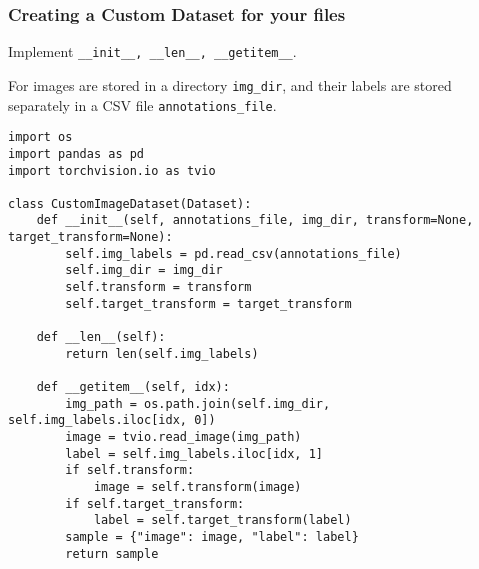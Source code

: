 \begin{frame}[fragile]
\frametitle{Creating a Custom Dataset for your files}

Implement \lstinline|__init__, __len__, __getitem__|.

For images are stored in a directory \lstinline|img_dir|, and their labels are stored separately in a CSV file \lstinline|annotations_file|.

\begin{lstlisting}
import os
import pandas as pd
import torchvision.io as tvio

class CustomImageDataset(Dataset):
    def __init__(self, annotations_file, img_dir, transform=None, target_transform=None):
        self.img_labels = pd.read_csv(annotations_file)
        self.img_dir = img_dir
        self.transform = transform
        self.target_transform = target_transform

    def __len__(self):
        return len(self.img_labels)

    def __getitem__(self, idx):
        img_path = os.path.join(self.img_dir, self.img_labels.iloc[idx, 0])
        image = tvio.read_image(img_path)
        label = self.img_labels.iloc[idx, 1]
        if self.transform:
            image = self.transform(image)
        if self.target_transform:
            label = self.target_transform(label)
        sample = {"image": image, "label": label}
        return sample
\end{lstlisting}

\end{frame} 







